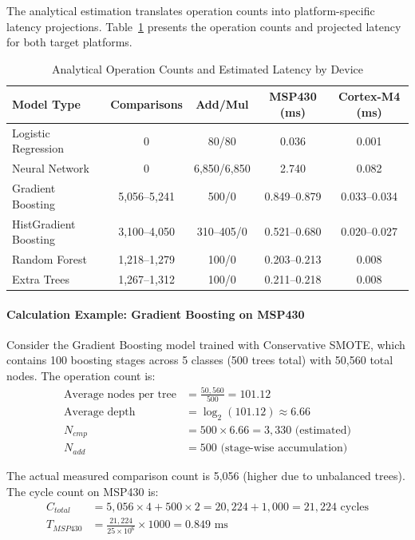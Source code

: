 The analytical estimation translates operation counts into platform-specific latency projections. Table~\ref{tab:analytical_latency} presents the operation counts and projected latency for both target platforms.

\begin{table}[htbp]
\centering
\caption{Analytical Operation Counts and Estimated Latency by Device}
\label{tab:analytical_latency}
\begin{tabular}{lcccc}
\hline
\textbf{Model Type} & \textbf{Comparisons} & \textbf{Add/Mul} & \textbf{MSP430 (ms)} & \textbf{Cortex-M4 (ms)} \\
\hline
Logistic Regression & 0 & 80/80 & 0.036 & 0.001 \\
Neural Network & 0 & 6,850/6,850 & 2.740 & 0.082 \\
Gradient Boosting & 5,056--5,241 & 500/0 & 0.849--0.879 & 0.033--0.034 \\
HistGradient Boosting & 3,100--4,050 & 310--405/0 & 0.521--0.680 & 0.020--0.027 \\
Random Forest & 1,218--1,279 & 100/0 & 0.203--0.213 & 0.008 \\
Extra Trees & 1,267--1,312 & 100/0 & 0.211--0.218 & 0.008 \\
\hline
\end{tabular}
\end{table}

\paragraph{Calculation Example: Gradient Boosting on MSP430}
Consider the Gradient Boosting model trained with Conservative SMOTE, which contains 100 boosting stages across 5 classes (500 trees total) with 50,560 total nodes. The operation count is:
\begin{align}
    \text{Average nodes per tree} &= \frac{50,560}{500} = 101.12 \\
    \text{Average depth} &= \log_2(101.12) \approx 6.66 \\
    N_{cmp} &= 500 \times 6.66 = 3,330 \text{ (estimated)} \\
    N_{add} &= 500 \text{ (stage-wise accumulation)}
\end{align}

The actual measured comparison count is 5,056 (higher due to unbalanced trees). The cycle count on MSP430 is:
\begin{align}
    C_{total} &= 5,056 \times 4 + 500 \times 2 = 20,224 + 1,000 = 21,224 \text{ cycles} \\
    T_{MSP430} &= \frac{21,224}{25 \times 10^6} \times 1000 = 0.849 \text{ ms}
\end{align}


